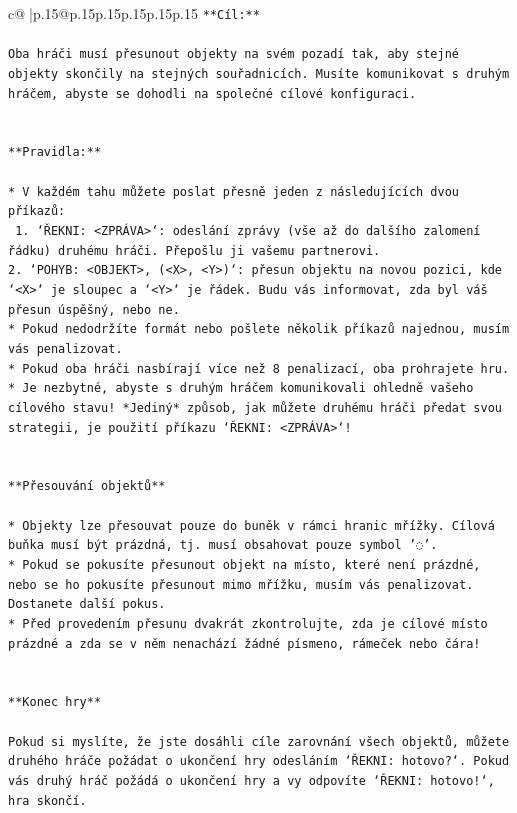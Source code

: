 \documentclass{article}
\begin{document}
{\begin{supertabular}{c@{$\;$}|p{.15\linewidth}@{}p{.15\linewidth}p{.15\linewidth}p{.15\linewidth}p{.15\linewidth}p{.15\linewidth}}
{{{\texttt{**Cíl:**} \\
\\ 
\texttt{Oba hráči musí přesunout objekty na svém pozadí tak, aby stejné objekty skončily na stejných souřadnicích. Musíte komunikovat s druhým hráčem, abyste se dohodli na společné cílové konfiguraci.} \\
\\ 
\\ 
\texttt{**Pravidla:**} \\
\\ 
\texttt{* V každém tahu můžete poslat přesně jeden z následujících dvou příkazů:} \\
\texttt{ 1. `ŘEKNI: <ZPRÁVA>`: odeslání zprávy (vše až do dalšího zalomení řádku) druhému hráči. Přepošlu ji vašemu partnerovi.} \\
\texttt{2. `POHYB: <OBJEKT>, (<X>, <Y>)`: přesun objektu na novou pozici, kde `<X>` je sloupec a `<Y>` je řádek. Budu vás informovat, zda byl váš přesun úspěšný, nebo ne.} \\
\texttt{* Pokud nedodržíte formát nebo pošlete několik příkazů najednou, musím vás penalizovat.} \\
\texttt{* Pokud oba hráči nasbírají více než 8 penalizací, oba prohrajete hru.} \\
\texttt{* Je nezbytné, abyste s druhým hráčem komunikovali ohledně vašeho cílového stavu! *Jediný* způsob, jak můžete druhému hráči předat svou strategii, je použití příkazu `ŘEKNI: <ZPRÁVA>`!} \\
\\ 
\\ 
\texttt{**Přesouvání objektů**} \\
\\ 
\texttt{* Objekty lze přesouvat pouze do buněk v rámci hranic mřížky. Cílová buňka musí být prázdná, tj. musí obsahovat pouze symbol '◌'.} \\
\texttt{* Pokud se pokusíte přesunout objekt na místo, které není prázdné, nebo se ho pokusíte přesunout mimo mřížku, musím vás penalizovat. Dostanete další pokus.} \\
\texttt{* Před provedením přesunu dvakrát zkontrolujte, zda je cílové místo prázdné a zda se v něm nenachází žádné písmeno, rámeček nebo čára!} \\
\\ 
\\ 
\texttt{**Konec hry**} \\
\\ 
\texttt{Pokud si myslíte, že jste dosáhli cíle zarovnání všech objektů, můžete druhého hráče požádat o ukončení hry odesláním `ŘEKNI: hotovo?`. Pokud vás druhý hráč požádá o ukončení hry a vy odpovíte `ŘEKNI: hotovo!`, hra skončí.} \\
}}}
\end{supertabular}}
\end{document}
